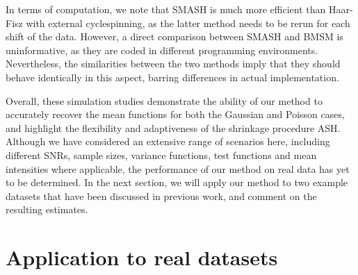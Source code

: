 \documentclass[12pt]{article}
\begin{document}
In terms of computation, we note that SMASH is much more efficient than Haar-Fisz with external cyclespinning, as the latter method needs to be rerun for each shift of the data. However, a direct comparison between SMASH and BMSM is uninformative, as they are coded in different programming environments. Nevertheless, the similarities between the two methods imply that they should behave identically in this aspect, barring differences in actual implementation.

Overall, these simulation studies demonstrate the ability of our method to accurately recover the mean functions for both the Gaussian and Poisson cases, and highlight the flexibility and adaptiveness of the shrinkage procedure ASH. Although we have considered an extensive range of scenarios here, including different SNRs, sample sizes, variance functions, test functions and mean intensities where applicable, the performance of our method on real data has yet to be determined. In the next section, we will apply our method to two example datasets that have been discussed in previous work, and comment on the resulting estimates.


\section{Application to real datasets}
\end{document}
